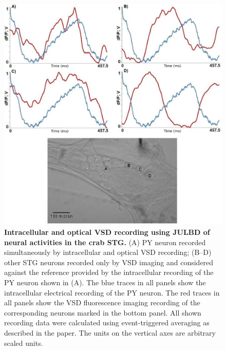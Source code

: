 \begin{figure}[H]
	\begin{center}
		\includegraphics[width=\columnwidth]{graphics/julbdrecording.png}
		\caption[Intracellular and optical \ac{VSD} recording using JULBD of neural activities in the crab STG.]{\textbf{Intracellular and optical \ac{VSD} recording using JULBD of neural activities in the crab STG.} (A) \ac{PY} neuron recorded simultaneously by intracellular and optical \ac{VSD} recording; (B–D) other \ac{STG} neurons recorded only by \ac{VSD} imaging and considered against the reference provided by the intracellular recording of the \ac{PY} neuron shown in (A). The blue traces in all panels show the intracellular electrical recording of the \ac{PY} neuron. The red traces in all panels show the \ac{VSD} fluorescence imaging recording of the corresponding neurons marked in the bottom panel. All shown recording data were calculated using event-triggered averaging as described in the paper. The units on the vertical axes are arbitrary scaled units.}
		\label{fig:julbdrecording}
	\end{center}
\end{figure}
